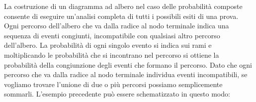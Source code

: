 \begin{minipage}{.49\textwidth}
 La costruzione di un diagramma ad albero nel caso delle probabilità 
composte 
consente di eseguire un'analisi completa di tutti i possibili esiti di una 
prova. 
Ogni percorso dell'albero che va dalla radice al nodo terminale indica 
una sequenza di eventi congiunti, incompatibile con qualsiasi altro 
percorso 
dell'albero. La probabilità di ogni singolo evento si indica sui rami e 
moltiplicando le probabilità che si incontrano nel percorso si ottiene la 
probabilità della congiunzione degli eventi che formano il percorso. 
Dato che ogni percorso che va dalla radice al nodo terminale individua 
eventi incompatibili, se vogliamo trovare l'unione di due o più percorsi 
possiamo semplicemente sommarli.
L'esempio precedente può essere schematizzato in questo modo:
\end{minipage}
